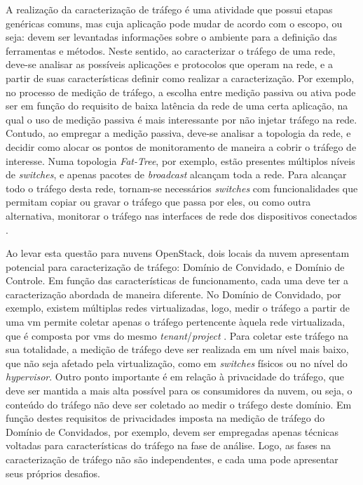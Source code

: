 A realização da caracterização de tráfego é uma atividade que possui etapas genéricas comuns, mas cuja aplicação pode mudar de acordo com o escopo, ou seja: devem ser levantadas informações sobre o ambiente para a definição das ferramentas e métodos.
%
Neste sentido, ao caracterizar o tráfego de uma rede, deve-se analisar as possíveis aplicações e protocolos que operam na rede, e a partir de suas características definir como realizar a caracterização.
%
Por exemplo, no processo de medição de tráfego, a escolha entre medição passiva ou ativa pode ser em função do requisito de baixa latência da rede de uma certa aplicação, na qual o uso de medição passiva é mais interessante por não injetar tráfego na rede.
%
Contudo, ao empregar a medição passiva, deve-se analisar a topologia da rede, e decidir como alocar os pontos de monitoramento de maneira a cobrir o tráfego de interesse.
%
Numa topologia \textit{Fat-Tree}, por exemplo, estão presentes múltiplos níveis de \textit{switches}, e apenas pacotes de \textit{broadcast} alcançam toda a rede.
%
Para alcançar todo o tráfego desta rede, tornam-se necessários \textit{switches} com funcionalidades que permitam copiar ou gravar o tráfego que passa por eles, ou como outra alternativa, monitorar o tráfego nas interfaces de rede dos dispositivos conectados \cite{zhang:2007:mirrorport}.

Ao levar esta questão para nuvens OpenStack, dois locais da nuvem apresentam potencial para caracterização de tráfego: Domínio de Convidado, e Domínio de Controle.
%
Em função das características de funcionamento, cada uma deve ter a caracterização abordada de maneira diferente.
%
No Domínio de Convidado, por exemplo, existem múltiplas redes virtualizadas, logo, medir o tráfego a partir de uma \ac{vm} permite coletar apenas o tráfego pertencente àquela rede virtualizada, que é composta por \acp{vm} do mesmo \textit{tenant}/\textit{project} \cite{denton:2016:neutron}.
%
Para coletar este tráfego na sua totalidade, a medição de tráfego deve ser realizada em um nível mais baixo, que não seja afetado pela virtualização, como em \textit{switches} físicos ou no nível do \textit{hypervisor}.
%
Outro ponto importante é em relação à privacidade do tráfego, que deve ser mantida a mais alta possível para os consumidores da nuvem, ou seja, o conteúdo do tráfego não deve ser coletado ao medir o tráfego deste domínio.
%
Em função destes requisitos de privacidades imposta na medição de tráfego do Domínio de Convidados, por exemplo, devem ser empregadas apenas técnicas voltadas para características do tráfego na fase de análise.
%
Logo, as fases na caracterização de tráfego não são independentes, e cada uma pode apresentar seus próprios desafios.

